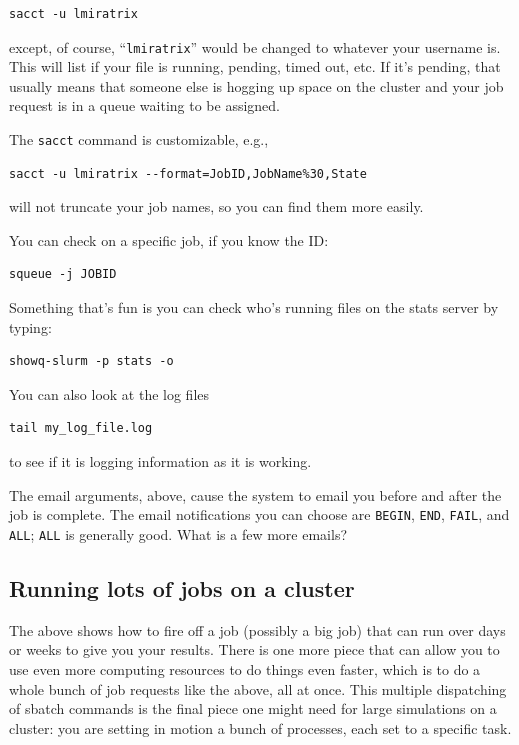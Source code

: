 \documentclass[
]{book}
\begin{document}
\begin{verbatim}
sacct -u lmiratrix
\end{verbatim}

except, of course, ``\texttt{lmiratrix}'' would be changed to whatever your username is.
This will list if your file is running, pending, timed out, etc. If it's pending, that usually means that someone else is hogging up space on the cluster and your job request is in a queue waiting to be assigned.

The \texttt{sacct} command is customizable, e.g.,

\begin{verbatim}
sacct -u lmiratrix --format=JobID,JobName%30,State
\end{verbatim}

will not truncate your job names, so you can find them more easily.

You can check on a specific job, if you know the ID:

\begin{verbatim}
squeue -j JOBID
\end{verbatim}

Something that's fun is you can check who's running files on the stats server by typing:

\begin{verbatim}
showq-slurm -p stats -o
\end{verbatim}

You can also look at the log files

\begin{verbatim}
tail my_log_file.log
\end{verbatim}

to see if it is logging information as it is working.

The email arguments, above, cause the system to email you before and after the job is complete.
The email notifications you can choose are \texttt{BEGIN}, \texttt{END}, \texttt{FAIL}, and \texttt{ALL}; \texttt{ALL} is generally good. What is a few more emails?

\hypertarget{running-lots-of-jobs-on-a-cluster}{%
\subsection{Running lots of jobs on a cluster}\label{running-lots-of-jobs-on-a-cluster}}

The above shows how to fire off a job (possibly a big job) that can run over days or weeks to give you your results.
There is one more piece that can allow you to use even more computing resources to do things even faster, which is to do a whole bunch of job requests like the above, all at once.
This multiple dispatching of sbatch commands is the final piece one might need for large simulations on a cluster: you are setting in motion a bunch of processes, each set to a specific task.
\end{document}
